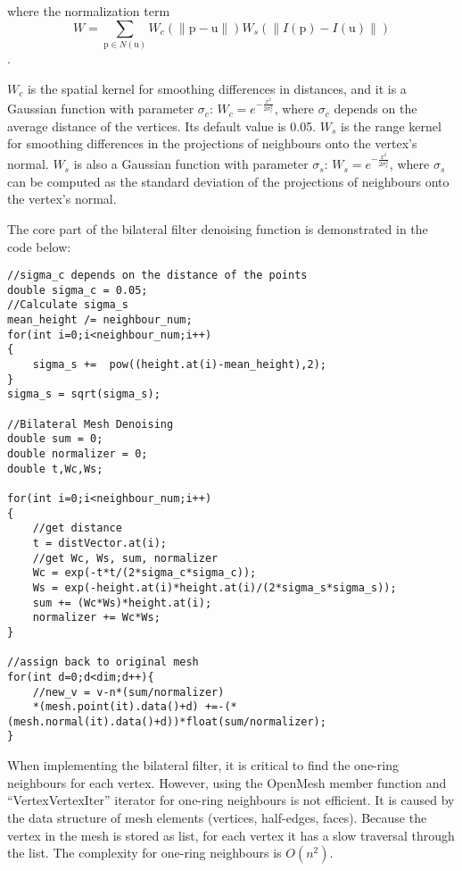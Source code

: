 where the normalization term
\begin{equation} \label{normalizer}
W = \sum_{\bm{\mathrm{p}} \in N(\bm{\mathrm{u}})}W_c(\|\bm{\mathrm{p}}-\bm{\mathrm{u}}\|)W_s(\|I(\bm{\mathrm{p}})-I(\bm{\mathrm{u}})\|)
\end{equation}.

$W_c$ is the spatial kernel for smoothing differences in distances, and it is a Gaussian function with parameter $\sigma_c$: $W_c=e^{-\frac{x^2}{2 \sigma_c^2}}$, where $\sigma_c$ depends on the average distance of the vertices. Its default value is 0.05. $W_s$ is the range kernel for smoothing differences in the projections of neighbours onto the vertex's normal. $W_s$ is also a Gaussian function with parameter $\sigma_s$: $W_s=e^{-\frac{x^2}{2 \sigma_s^2}}$, where $\sigma_s$ can be computed as the standard deviation of the projections of neighbours onto the vertex's normal. 

The core part of the bilateral filter denoising function is demonstrated in the code below:
\begin{lstlisting}[xleftmargin=1em]
//sigma_c depends on the distance of the points
double sigma_c = 0.05; 
//Calculate sigma_s
mean_height /= neighbour_num;
for(int i=0;i<neighbour_num;i++)
{
	sigma_s +=  pow((height.at(i)-mean_height),2);
}
sigma_s = sqrt(sigma_s);

//Bilateral Mesh Denoising
double sum = 0;
double normalizer = 0;
double t,Wc,Ws;

for(int i=0;i<neighbour_num;i++)
{
	//get distance
	t = distVector.at(i);
	//get Wc, Ws, sum, normalizer
	Wc = exp(-t*t/(2*sigma_c*sigma_c));
	Ws = exp(-height.at(i)*height.at(i)/(2*sigma_s*sigma_s));
	sum += (Wc*Ws)*height.at(i);
	normalizer += Wc*Ws;
}

//assign back to original mesh
for(int d=0;d<dim;d++){
	//new_v = v-n*(sum/normalizer)
	*(mesh.point(it).data()+d) +=-(*(mesh.normal(it).data()+d))*float(sum/normalizer);
}
\end{lstlisting}

When implementing the bilateral filter, it is critical to find the one-ring neighbours for each vertex. However, using the OpenMesh member function and ``VertexVertexIter'' iterator for one-ring neighbours is not efficient. It is caused by the data structure of mesh elements (vertices, half-edges, faces). Because the vertex in the mesh is stored as list, for each vertex it has a slow traversal through the list. The complexity for one-ring neighbours is $O(n^2)$. 

